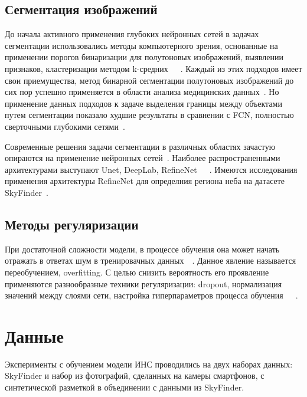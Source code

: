 \subsection{Сегментация изображений}

До начала активного применения глубоких нейронных сетей в задачах сегментации использовались методы компьютерного зрения, основанные на применении порогов бинаризации для полутоновых изображений, выявлении признаков, кластеризации методом k-средних~\autocite{10.5555/1888028.1888043}~\autocite{10.5555/540298}~\autocite{inproceedings}. Каждый из этих подходов имеет свои приемущества, метод бинарной сегментации полутоновых изображений до сих пор успешно применяется в области анализа медицинских данных~\autocite{bookMedicalImages}. Но применение данных подходов к задаче выделения границы между объектами путем сегментации показало худшие результаты в сравнении с FCN, полностью сверточными глубокими сетями~\autocite{7966418}.

Современные решения задачи сегментации в различных областях зачастую опираются на применение нейронных сетей~\autocite{feng2019deep}. Наиболее распространенными архитектурами выступают Unet, DeepLab, RefineNet~\autocite{ronneberger2015unet}~\autocite{chen2016deeplab}~\autocite{lin2016refinenet}. Имеются исследования применения архитектуры RefineNet для определния региона неба на датасете SkyFinder~\autocite{place2017segmenting}.


\subsection{Методы регуляризации}

При достаточной сложности модели, в процессе обучения она может начать отражать в ответах шум в тренировачных данных~\autocite{salman2019overfitting}~\autocite{ghojogh2019theory}. Данное явление называется переобучением, overfitting. С целью снизить вероятность его проявление применяются разнообразные техники регуляризации: dropout, нормализация значений между слоями сети, настройка гиперпараметров процесса обучения~\autocite{smith2018disciplined}~\autocite{labach2019survey}~\autocite{ioffe2015batch}.

\section{Данные}

Эксперименты с обучением модели ИНС проводились на двух наборах данных: SkyFinder и набор из фотографий, сделанных на камеры смартфонов, с синтетической разметкой в объединении с данными из SkyFinder. 

